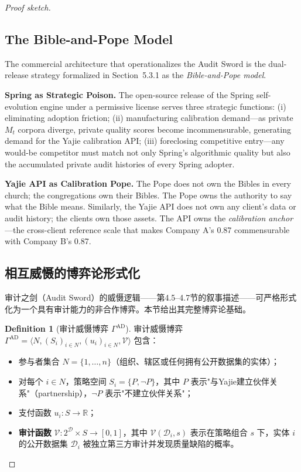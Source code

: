 \documentclass[12pt,a4paper]{ctexart}
\theoremstyle{definition}
\newtheorem{definition}{Definition}[section]
\theoremstyle{remark}
\begin{document}
\begin{proof}[Proof sketch]
\subsection{The Bible-and-Pope Model}

The commercial architecture that operationalizes the Audit Sword is the dual-release strategy formalized in Section~5.3.1 as the \textit{Bible-and-Pope model}.

\textbf{Spring as Strategic Poison.} The open-source release of the Spring self-evolution engine under a permissive license serves three strategic functions: (i) eliminating adoption friction; (ii) manufacturing calibration demand—as private $M_t$ corpora diverge, private quality scores become incommensurable, generating demand for the Yajie calibration API; (iii) foreclosing competitive entry—any would-be competitor must match not only Spring's algorithmic quality but also the accumulated private audit histories of every Spring adopter.

\textbf{Yajie API as Calibration Pope.} The Pope does not own the Bibles in every church; the congregations own their Bibles. The Pope owns the authority to say what the Bible means. Similarly, the Yajie API does not own any client's data or audit history; the clients own those assets. The API owns the \textit{calibration anchor}—the cross-client reference scale that makes Company A's 0.87 commensurable with Company B's 0.87.

\subsection{相互威慑的博弈论形式化}

审计之剑（Audit Sword）的威慑逻辑——第4.5--4.7节的叙事描述——可严格形式化为一个具有审计能力的非合作博弈。本节给出其完整博弈论基础。

\begin{definition}[审计威慑博弈 $\Gamma^{\text{AD}}$]
\label{def:audit-deterrence-game}
审计威慑博弈 $\Gamma^{\text{AD}} = \langle N, (S_i)_{i \in N}, (u_i)_{i \in N}, \mathcal{V} \rangle$ 包含：
\begin{itemize}[itemsep=2pt]
\item 参与者集合 $N = \{1, \ldots, n\}$（组织、辖区或任何拥有公开数据集的实体）；
\item 对每个 $i \in N$，策略空间 $S_i = \{P, \neg P\}$，其中 $P$ 表示"与Yajie建立伙伴关系"（partnership），$\neg P$ 表示"不建立伙伴关系"；
\item 支付函数 $u_i: S \to \mathbb{R}$；
\item \textbf{审计函数} $\mathcal{V}: 2^{\mathcal{D}} \times S \to [0,1]$，其中 $\mathcal{V}(\mathcal{D}_i, s)$ 表示在策略组合 $s$ 下，实体 $i$ 的公开数据集 $\mathcal{D}_i$ 被独立第三方审计并发现质量缺陷的概率。
\end{itemize}
\end{definition}


\end{proof}
\end{document}
